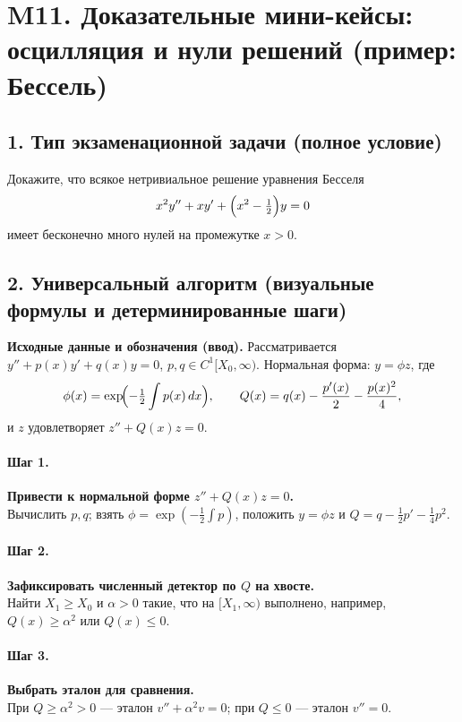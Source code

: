 \section{M11. Доказательные мини-кейсы: осцилляция и нули решений (пример: Бессель)}

\subsection*{1. Тип экзаменационной задачи (полное условие)}
Докажите, что всякое нетривиальное решение уравнения Бесселя
\[
x^{2}y''+x y'+\Bigl(x^{2}-\tfrac12\Bigr)y=0
\]
имеет бесконечно много нулей на промежутке \(x>0\).

\subsection*{2. Универсальный алгоритм (визуальные формулы и детерминированные шаги)}

\textbf{Исходные данные и обозначения (ввод).}
Рассматривается \(y''+p(x)y'+q(x)y=0\), \(p,q\in C^{1}[X_0,\infty)\).
Нормальная форма: \(y=\phi z\), где
\[
\phi(x)=\exp\!\Bigl(-\tfrac12\int p(x)\,dx\Bigr),\qquad
Q(x)=q(x)-\frac{p'(x)}{2}-\frac{p(x)^{2}}{4},
\]
и \(z\) удовлетворяет \(z''+Q(x)z=0\).

\paragraph{Шаг 1.} \textbf{Привести к нормальной форме \(z''+Q(x)z=0\).}\\
Вычислить \(p,q\); взять \(\phi=\exp(-\tfrac12\int p)\), положить \(y=\phi z\) и \(Q=q-\tfrac12 p'-\tfrac14 p^{2}\).

\paragraph{Шаг 2.} \textbf{Зафиксировать численный детектор по \(Q\) на хвосте.}\\
Найти \(X_1\ge X_0\) и \(\alpha>0\) такие, что на \([X_1,\infty)\) выполнено, например, \(Q(x)\ge \alpha^{2}\) или \(Q(x)\le 0\).

\paragraph{Шаг 3.} \textbf{Выбрать эталон для сравнения.}\\
При \(Q\ge \alpha^{2}>0\) — эталон \(v''+\alpha^{2}v=0\); при \(Q\le 0\) — эталон \(v''=0\).

